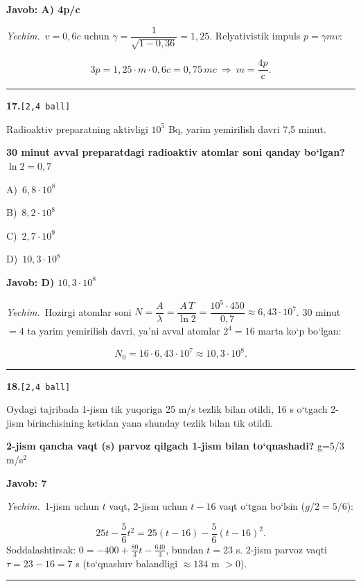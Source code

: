 \documentclass[11pt,a4paper]{article}
\newcommand{\ball}[1]{\hfill\texttt{[#1 ball]}}
\newcommand{\qhead}[2]{\Needspace{10\baselineskip}\noindent\textbf{#1.}\ball{#2}\par\nopagebreak}
\newcommand{\opt}[2]{\hspace*{8mm}#1)\ #2\par}
\newenvironment{qbody}{\begin{list}{}{\leftmargin=8mm\rightmargin=0pt\topsep=0pt\itemsep=0pt\parsep=3pt}\item\relax}{\end{list}}
\begin{document}
\noindent\colorbox{gray!12}{\parbox{\dimexpr\linewidth-2\fboxsep}{\textbf{Javob: A) 4p/c}}}\par\smallskip
\noindent\textit{Yechim.}\ $v=0{,}6c$ uchun $\gamma=\dfrac{1}{\sqrt{1-0{,}36}}=1{,}25$. Relyativistik impuls $p=\gamma m v$:\par
\[3p=1{,}25\cdot m\cdot0{,}6c=0{,}75\,mc\ \Rightarrow\ m=\frac{4p}{c}.\]\par\medskip\hrule\medskip
\noindent\begin{minipage}{\linewidth}
\qhead{17}{2,4}
\begin{qbody}
Radioaktiv preparatning aktivligi $10^5$ Bq, yarim yemirilish davri 7,5 minut.\par
\textbf{30 minut avval preparatdagi radioaktiv atomlar soni qanday bo‘lgan?} $\ln 2 = 0{,}7$\par
\smallskip
\opt{A}{$6{,}8\cdot10^8$}
\opt{B}{$8{,}2\cdot10^8$}
\opt{C}{$2{,}7\cdot10^9$}
\opt{D}{$10{,}3\cdot10^8$}
\end{qbody}\end{minipage}\par\vspace{2pt}
\noindent\colorbox{gray!12}{\parbox{\dimexpr\linewidth-2\fboxsep}{\textbf{Javob: D) $10{,}3\cdot10^8$}}}\par\smallskip
\noindent\textit{Yechim.}\ Hozirgi atomlar soni $N=\dfrac{A}{\lambda}=\dfrac{A\,T}{\ln2}=\dfrac{10^5\cdot450}{0{,}7}\approx6{,}43\cdot10^7$. 30 minut $=4$ ta yarim yemirilish davri, ya’ni avval atomlar $2^4=16$ marta ko‘p bo‘lgan:\par
\[N_0=16\cdot6{,}43\cdot10^7\approx10{,}3\cdot10^8.\]\par\medskip\hrule\medskip
\qhead{18}{2,4}
\begin{qbody}
Oydagi tajribada 1-jism tik yuqoriga 25 m/s tezlik bilan otildi, 16 s o‘tgach 2-jism birinchisining ketidan yana shunday tezlik bilan tik otildi.\par
\textbf{2-jism qancha vaqt (s) parvoz qilgach 1-jism bilan to‘qnashadi?} g=5/3 m/s$^{2}$\par
\end{qbody}
\noindent\colorbox{gray!12}{\parbox{\dimexpr\linewidth-2\fboxsep}{\textbf{Javob: 7}}}\par\smallskip
\noindent\textit{Yechim.}\ 1-jism uchun $t$ vaqt, 2-jism uchun $t-16$ vaqt o‘tgan bo‘lsin ($g/2=5/6$):\par
\[25t-\frac56t^2=25(t-16)-\frac56(t-16)^2.\]
Soddalashtirsak: $0=-400+\frac{80}{3}t-\frac{640}{3}$, bundan $t=23$ s. 2-jism parvoz vaqti $\tau=23-16=7$ s (to‘qnashuv balandligi $\approx134$ m $>0$).\par\par\medskip\hrule\medskip
\end{document}
